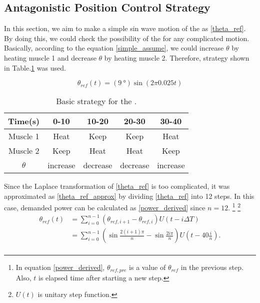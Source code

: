 \subsection{Antagonistic Position Control Strategy}
In this section, we aim to make a simple sin wave motion of the \anta as \eqref{theta_ref}. By doing this, we could check the possibility of the \apc for any complicated motion. Basically, according to the equation \eqref{simple_assume}, we could increase $\theta$ by heating muscle 1 and decrease $\theta$ by heating muscle 2. Therefore, strategy shown in Table.\ref{table_apc_basic} was used.




\begin{equation}\label{theta_ref}
\theta_{ref}(t)=(\SI{9}{\degree})\sin(2\pi 0.025t)
\end{equation}

\begin{table}[t]
	\caption{Basic strategy for the \apc.}
	\label{table_apc_basic}
	\begin{center}
		\begin{tabular}{c||c|c|c|c}
			\hline
			Time(s) & 0-10 & 10-20 & 20-30 & 30-40 \\
			\hline
			Muscle 1 & Heat & Keep & Keep & Heat \\
			Muscle 2 & Keep & Heat & Heat & Keep \\
			\hline
			$\theta$ & increase & decrease & decrease & increase \\
			\hline
		\end{tabular}
	\end{center}
\end{table}

Since the Laplace transformation of \eqref{theta_ref} is too complicated, 
it was approximated as \eqref{theta_ref_approx} by dividing \eqref{theta_ref} into 12 steps. In this case, demanded power can be calculated as \eqref{power_derived} since $n=12$.
\footnote{In equation \eqref{power_derived}, $\theta_{ref,pre}$ is a value of $\theta_{ref}$ in the previous step. Also, $t$ is elapsed time after starting a new step.}
\footnote{$U(t)$ is unitary step function.}
\begin{equation} \label{theta_ref_approx}
\begin{aligned} 
\theta_{ref}(t) & = \sum_{i=0}^{n-1}{(\theta_{ref,i+1}-\theta_{ref,i})U(t-i\Delta T)} \\
& = \sum_{i=0}^{n-1}{\left(\sin{\frac{2(i+1)\pi}{n}}-\sin{\frac{2i\pi}{n}}\right)U\left(t-40\frac{i}{n}\right)}. \\
\end{aligned}
\end{equation}

